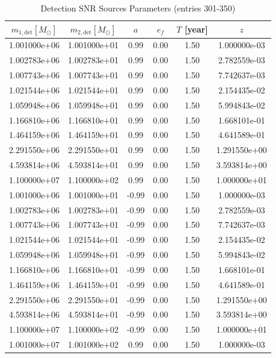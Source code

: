 \documentclass{article}
\begin{document}
\clearpage

\begin{table}[htbp]
\centering
\caption{Detection SNR Sources Parameters (entries 301-350)}
\label{tab:snr_sources_7}
\begin{tabular}{cccccc}
\hline
$m_{1,\mathrm{det}} [M_\odot]$ & $m_{2,\mathrm{det}} [M_\odot]$ & $a$ & $e_f$ & $T$ [year] & $z$ \\
\hline
1.001000e+06 & 1.001000e+01 & 0.99 & 0.00 & 1.50 & 1.000000e-03 \\
1.002783e+06 & 1.002783e+01 & 0.99 & 0.00 & 1.50 & 2.782559e-03 \\
1.007743e+06 & 1.007743e+01 & 0.99 & 0.00 & 1.50 & 7.742637e-03 \\
1.021544e+06 & 1.021544e+01 & 0.99 & 0.00 & 1.50 & 2.154435e-02 \\
1.059948e+06 & 1.059948e+01 & 0.99 & 0.00 & 1.50 & 5.994843e-02 \\
1.166810e+06 & 1.166810e+01 & 0.99 & 0.00 & 1.50 & 1.668101e-01 \\
1.464159e+06 & 1.464159e+01 & 0.99 & 0.00 & 1.50 & 4.641589e-01 \\
2.291550e+06 & 2.291550e+01 & 0.99 & 0.00 & 1.50 & 1.291550e+00 \\
4.593814e+06 & 4.593814e+01 & 0.99 & 0.00 & 1.50 & 3.593814e+00 \\
1.100000e+07 & 1.100000e+02 & 0.99 & 0.00 & 1.50 & 1.000000e+01 \\
1.001000e+06 & 1.001000e+01 & -0.99 & 0.00 & 1.50 & 1.000000e-03 \\
1.002783e+06 & 1.002783e+01 & -0.99 & 0.00 & 1.50 & 2.782559e-03 \\
1.007743e+06 & 1.007743e+01 & -0.99 & 0.00 & 1.50 & 7.742637e-03 \\
1.021544e+06 & 1.021544e+01 & -0.99 & 0.00 & 1.50 & 2.154435e-02 \\
1.059948e+06 & 1.059948e+01 & -0.99 & 0.00 & 1.50 & 5.994843e-02 \\
1.166810e+06 & 1.166810e+01 & -0.99 & 0.00 & 1.50 & 1.668101e-01 \\
1.464159e+06 & 1.464159e+01 & -0.99 & 0.00 & 1.50 & 4.641589e-01 \\
2.291550e+06 & 2.291550e+01 & -0.99 & 0.00 & 1.50 & 1.291550e+00 \\
4.593814e+06 & 4.593814e+01 & -0.99 & 0.00 & 1.50 & 3.593814e+00 \\
1.100000e+07 & 1.100000e+02 & -0.99 & 0.00 & 1.50 & 1.000000e+01 \\
1.001000e+07 & 1.001000e+02 & 0.99 & 0.00 & 1.50 & 1.000000e-03 \\

\end{tabular}
\end{table}
\end{document}
